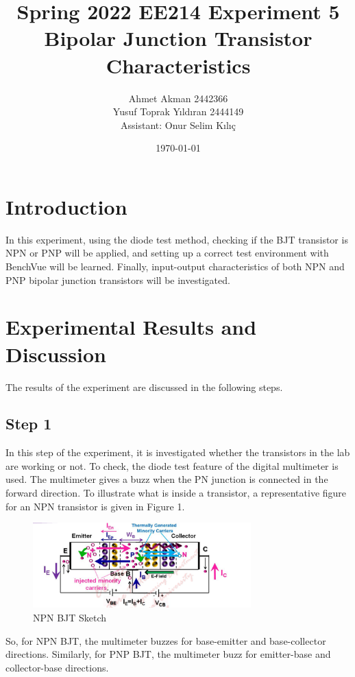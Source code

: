 \documentclass[letterpaper,12pt]{article}
\begin{document}
\thispagestyle{empty}

\title{Spring 2022 EE214 Experiment 5  \protect\\ Bipolar Junction Transistor Characteristics}
\author{Ahmet Akman 2442366 \protect\\ Yusuf Toprak Yıldıran 2444149 \protect\\ Assistant: Onur Selim Kılıç}
\date{\today}
\maketitle
\tableofcontents
\section{Introduction}
In this experiment, using the diode test method, checking if the BJT transistor is NPN or PNP will be applied, and setting up a correct test environment with BenchVue will be learned. Finally, input-output characteristics of both NPN and PNP bipolar junction transistors will be investigated.

\section{Experimental Results and Discussion}
The results of the experiment are discussed in the following steps.
%
\subsection{Step 1}
In this step of the experiment, it is investigated whether the transistors in the lab are working or not. To check, the diode test feature of the digital multimeter is used. The multimeter gives a buzz when the PN junction is connected in the forward direction. To illustrate what is inside a transistor, a representative figure for an NPN transistor is given in Figure 1.

\begin{figure}[H]
    \centering
    \includegraphics[width = 0.75\textwidth]{bjt.png}
    \caption{NPN BJT Sketch}
\end{figure} 
So, for NPN BJT, the multimeter buzzes for base-emitter and base-collector directions. Similarly, for PNP BJT, the multimeter buzz for emitter-base and collector-base directions.
\end{document}

